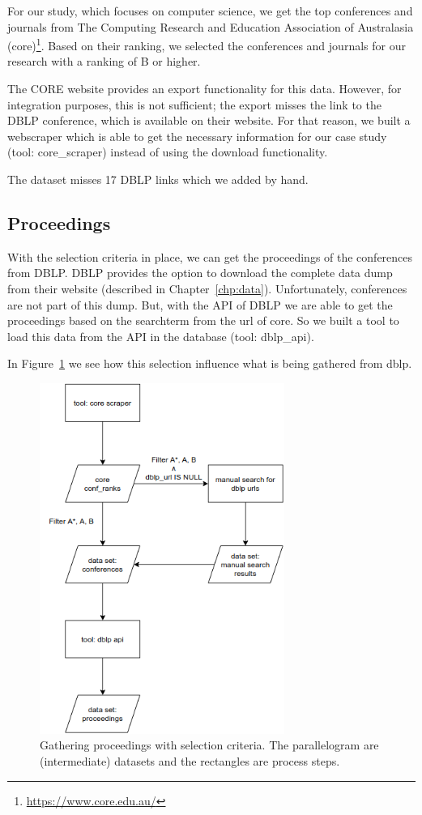 \documentclass{ou-report}
\begin{document}
For our study, which focuses on computer science, we get the top conferences 
and journals from The Computing Research and Education Association of 
Australasia (core)\footnote{\url{https://www.core.edu.au/}}. Based on their 
ranking, we selected the conferences and journals for our research with a 
ranking of B or higher.

The CORE website provides an export functionality for this data. However, for 
integration purposes, this is not sufficient; the export misses the link to 
the DBLP conference, which is available on their website. For that reason, we 
built a webscraper which is able to get the necessary information for our case 
study (tool: core\_scraper) instead of using the download functionality.

The dataset misses 17 DBLP links which we added by hand.

\subsection{Proceedings}
With the selection criteria in place, we can get the proceedings of the 
conferences from DBLP. DBLP provides the option to download the complete data 
dump from their website (described in Chapter~\ref{chp:data}). 
Unfortunately, conferences are not part of this dump. But, with the API of DBLP
we are able to get the proceedings based on the searchterm from the url of core.
So we built a tool to load this data from the API in the database (tool: dblp\_api).

In Figure~\ref{fig:data_integration_core_dblp_api} we see how this selection 
influence what is being gathered from dblp. 

\begin{figure}[H]
    \centering
    \includegraphics[width=8cm]{images/data_integration/core_dblp_api.drawio.png}
    \caption{Gathering proceedings with selection criteria. The parallelogram are 
    (intermediate) datasets and the rectangles are process steps.}
    \label{fig:data_integration_core_dblp_api}
\end{figure}
\end{document}
